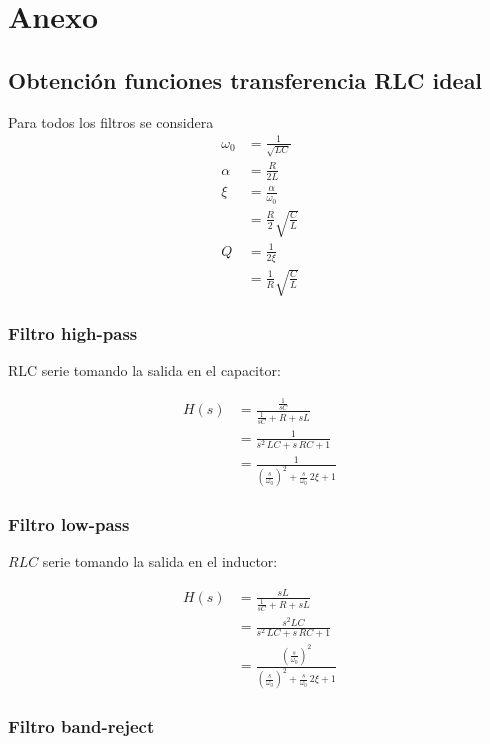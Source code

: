 \section{Anexo}

\subsection{Obtenci\'on funciones transferencia RLC ideal}
\label{ssec:ej2_H_rlc_ideal}

Para todos los filtros se considera 
\begin{align*}
\omega_0 &= \frac{1}{\sqrt{LC}}\\
\alpha &=\frac{R}{2L}\\
\xi &= \frac{\alpha}{\omega_0} \\ &= \frac{R}{2}\sqrt{\frac{C}{L}} \\
Q&=\frac{1}{2\xi} \\ &= \frac{1}{R}\sqrt{\frac{C}{L}}
\end{align*}

\subsubsection{Filtro high-pass}

RLC serie tomando la salida en el capacitor:

\begin{align}
H(s)&=\frac{\frac{1}{sC}}{\frac{1}{sC}+R+sL}	\\
&= \frac{1}{s^2 \, LC + s\, RC + 1}	\\
&= \frac{1}{\left(\frac{s}{\omega_0}\right)^2 + \frac{s}{\omega_0}\, 2\xi + 1}
\end{align}


\subsubsection{Filtro low-pass}

$RLC$ serie tomando la salida en el inductor:

\begin{align}
H(s)&=\frac{sL}{\frac{1}{sC}+R+sL}	\\
&= \frac{s^2LC}{s^2 \, LC + s\, RC + 1}	\\
&= \frac{\left(\frac{s}{\omega_0}\right)^2}{\left(\frac{s}{\omega_0}\right)^2 + \frac{s}{\omega_0}\, 2\xi + 1}
\end{align}

\subsubsection{Filtro band-reject}

